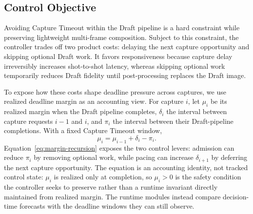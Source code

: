 \subsection{Control Objective}
\label{sec:objective}

Avoiding Capture Timeout within the Draft pipeline is a hard constraint while preserving lightweight multi-frame composition.
Subject to this constraint, the controller trades off two product costs: delaying the next capture opportunity and skipping optional Draft work.
It favors responsiveness because capture delay irreversibly increases shot-to-shot latency, whereas skipping optional work temporarily reduces Draft fidelity until post-processing replaces the Draft image.

To expose how these costs shape deadline pressure across captures, we use realized deadline margin as an accounting view.
For capture \(i\), let \(\mu_i\) be its realized margin when the Draft pipeline completes, \(\delta_i\) the interval between capture requests \(i-1\) and \(i\), and \(\pi_i\) the interval between their Draft-pipeline completions.
With a fixed Capture Timeout window,
\begin{equation}
\mu_i=\mu_{i-1}+\delta_i-\pi_i .
\label{eq:margin-recursion}
\end{equation}
Equation~\ref{eq:margin-recursion} exposes the two control levers: admission can reduce \(\pi_i\) by removing optional work, while pacing can increase \(\delta_{i+1}\) by deferring the next capture opportunity.
The equation is an accounting identity, not tracked control state: \(\mu_i\) is realized only at completion, so \(\mu_i>0\) is the safety condition the controller seeks to preserve rather than a runtime invariant directly maintained from realized margin.
The runtime modules instead compare decision-time forecasts with the deadline windows they can still observe.